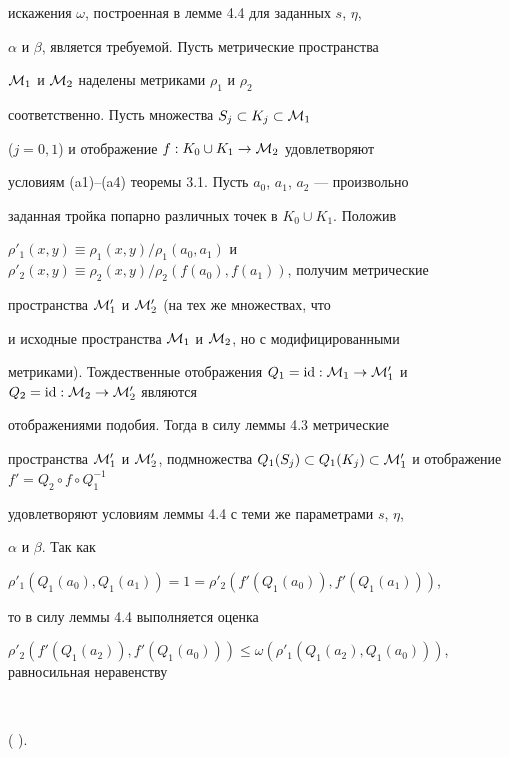 искажения $\omega$, построенная в лемме 4.4 для заданных $s$, $\eta$, 


$\alpha$ и $\beta$, является требуемой. Пусть метрические пространства 


${\cal M}_1$ и ${\cal M}_2$ наделены метриками $\rho_1$ и $\rho_2$ 


соответственно. Пусть множества $S_j \subset K_j \subset {\cal M}_1$ 


($j=0,1$) и отображение $f: K_0\cup K_1 \to {\cal M}_2 $ удовлетворяют 


условиям (a1)--(a4) теоремы 3.1. Пусть $a_0$, $a_1$, $a_2$ --- произвольно 


заданная тройка попарно различных точек в $K_0\cup K_1$. Положив 


$\rho'_1(x, y) \equiv \rho_1(x, y )/\rho_1(a_0, a_1)$ и $\rho'_2(x, y) 


\equiv \rho_2(x, y)/\rho_2(f(a_0), f(a_1))$, получим метрические 


пространства ${\cal M}'_1$ и ${\cal M}'_2$ (на тех же множествах, что 


и исходные пространства ${\cal M}_1$ и ${\cal M}_2$, но с модифицированными 


метриками). Тождественные отображения $Q_1=\id: {\cal M}_1 \to 


{\cal M}'_1$ и $Q_2=\id: {\cal M}_2 \to {\cal M}'_2 $ являются 


отображениями подобия. Тогда в силу леммы 4.3 метрические 


пространства ${\cal M}'_1$ и ${\cal M}'_2$, подмножества $Q_1(S_j) \subset 


Q_1(K_j) \subset {\cal M}'_1$ и отображение $f'=Q_2\circ f \circ Q_1^{-1}$ 


удовлетворяют условиям леммы 4.4 с теми же параметрами $s$, $\eta$, 


$\alpha$ и $\beta$. Так как 


$\rho'_1(Q_1(a_0), Q_1(a_1))=1=\rho'_2(f'(Q_1(a_0)), f'(Q_1(a_1)))$, 


то в силу леммы 4.4 выполняется оценка


$ \rho'_2(f'(Q_1(a_2)), f'(Q_1(a_0))) \leq \omega ( \rho'_1(Q_1(a_2), 


Q_1(a_0)))$, равносильная неравенству 


$$


 \leq 


\omega\bigg(  \bigg).


